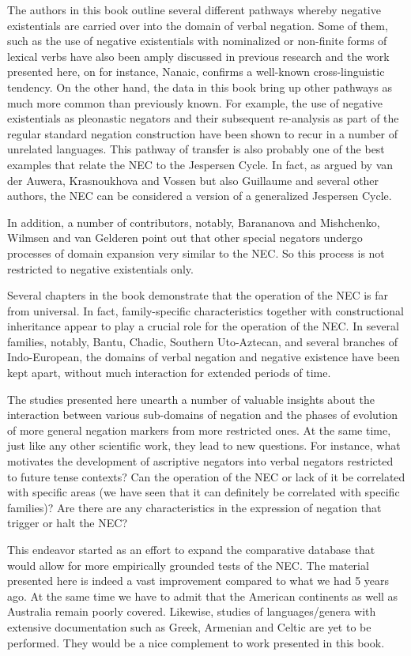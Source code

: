 \documentclass[output=paper,chinesefont,colorlinks,citecolor=brown]{langscibook}
\begin{document}
The authors in this book outline several different pathways whereby negative existentials are carried over into the domain of verbal negation. Some of them, such as the use of negative existentials with nominalized or non-finite forms of lexical verbs have also been amply discussed in previous research and the work presented here, on for instance, Nanaic, confirms a well-known cross-linguistic tendency. On the other hand, the data in this book bring up other pathways as much more common than previously known. For example, the use of negative existentials as pleonastic negators and their subsequent re-analysis as part of the regular standard negation construction have been shown to recur in a number of unrelated languages. This pathway of transfer is also probably one of the best examples that relate the NEC to the Jespersen Cycle. In fact, as argued by van der Auwera, Krasnoukhova and Vossen but also Guillaume and several other authors, the NEC can be considered a version of a generalized Jespersen Cycle.

In addition, a number of contributors, notably, Barananova and Mishchenko, Wilmsen and van Gelderen point out that other special negators undergo processes of domain expansion very similar to the NEC. So this process is not restricted to negative existentials only.

Several chapters in the book demonstrate that the operation of the NEC is far from universal. In fact, family-specific characteristics together with constructional inheritance appear to play a crucial role for the operation of the NEC. In several families, notably, Bantu, Chadic, Southern Uto-Aztecan, and several branches of Indo-European, the domains of verbal negation and negative existence have been kept apart, without much interaction for extended periods of time.

The studies presented here unearth a number of valuable insights about the interaction between various sub-domains of negation and the phases of evolution of more general negation markers from more restricted ones. At the same time, just like any other scientific work, they lead to new questions. For instance, what motivates the development of ascriptive negators into verbal negators restricted to future tense contexts? Can the operation of the NEC or lack of it be correlated with specific areas (we have seen that it can definitely be correlated with specific families)? Are there are any characteristics in the expression of negation that trigger or halt the NEC? 

This endeavor started as an effort to expand the comparative database that would allow for more empirically grounded tests of the NEC. The material presented here is indeed a vast improvement compared to what we had 5 years ago. At the same time we have to admit that the American continents as well as Australia remain poorly covered. Likewise, studies of languages{\slash}genera with extensive documentation such as Greek, Armenian and Celtic are yet to be performed. They would be a nice complement to work presented in this book.
\end{document}
